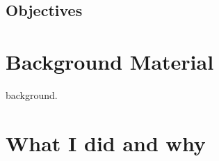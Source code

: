 \documentclass[a4paper]{article}
\begin{document}
\subsection{Objectives}

\section{Background Material}
background.

\section{What I did and why}



\iffalse
blockchain.h
c},style=c]{../src/blockchain.h}

blockchain.c
c},style=c]{../src/blockchain.c}

Makefile

\fi
\end{document}
